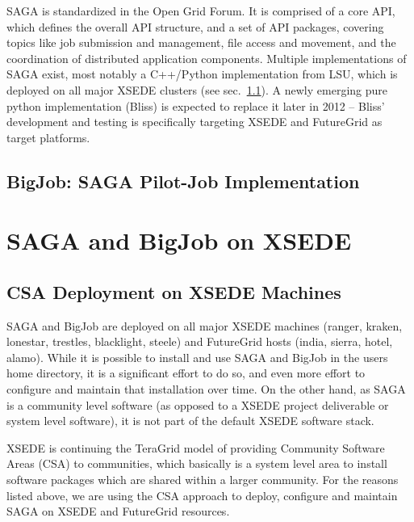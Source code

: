 \documentclass{sig-alternate}
\begin{document}
 SAGA is standardized in the Open Grid Forum.  It is comprised of a
 core API, which defines the overall API structure, and a set of API
 packages, covering topics like job submission and management, file
 access and movement, and the coordination of distributed application
 components.  Multiple implementations of SAGA exist, most notably a
 C++/Python implementation from LSU, which is deployed on all major
 XSEDE clusters (see sec.~\ref{ssec:csa}).  A newly emerging pure
 python implementation (Bliss) is expected to replace it later in
 2012 -- Bliss' development and testing is specifically targeting
 XSEDE and FutureGrid as target platforms.



\subsection{BigJob: SAGA Pilot-Job Implementation}

\section{SAGA and BigJob on XSEDE}

\subsection{CSA Deployment on XSEDE Machines}
 \label{ssec:csa}

 SAGA and BigJob are deployed on all major XSEDE machines (ranger,
 kraken, lonestar, trestles, blacklight, steele) and FutureGrid hosts
 (india, sierra, hotel, alamo).  While it is possible to install and
 use SAGA and BigJob in the users home directory, it is a significant
 effort to do so, and even more effort to configure and maintain that
 installation over time. On the other hand, as SAGA is a community
 level software (as opposed to a XSEDE project deliverable or system
 level software), it is not part of the default XSEDE software stack.

 XSEDE is continuing the TeraGrid model of providing Community
 Software Areas (CSA) to communities, which basically is a system
 level area to install software packages which are shared within a
 larger community.  For the reasons listed above, we are using the CSA
 approach to deploy, configure and maintain SAGA on XSEDE and
 FutureGrid resources.
\end{document}
